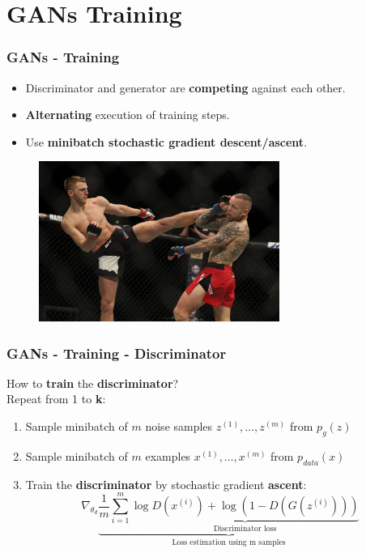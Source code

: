 \documentclass{beamer}
\begin{document}
\section{GANs Training}

\begin{frame}
	\frametitle{GANs - Training}
	\begin{itemize}
		\item Discriminator and generator are \textbf{competing} against each other.
		\item \textbf{Alternating} execution of training steps.
		\item Use \textbf{minibatch stochastic gradient descent/ascent}.
	\end{itemize}
	\begin{figure}
		\centering
		\includegraphics[width=0.7\textwidth]{images/fight.jpg}
	\end{figure}
\end{frame}

\begin{frame}
	\frametitle{GANs - Training - Discriminator}
	How to \textbf{train} the \textbf{discriminator}? \\
	Repeat from 1 to \textbf{k}:
		\begin{enumerate}
			\item Sample minibatch of $m$ noise samples ${z^{(1)},\dots,z^{(m)}}$ from $p_g(z)$
			\item Sample minibatch of $m$ examples ${x^{(1)},\dots,x^{(m)}}$ from $p_{data}(x)$
			\item Train the \textbf{discriminator} by stochastic gradient \textbf{ascent}:
		$$
			\nabla_{\theta_d} \underbrace{\frac{1}{m} \sum_{i=1}^{m} \underbrace{\log D(x^{(i)}) + \log(1 - D(G(z^{(i)})))}_{\text{Discriminator loss}}}_{\text{Loss estimation using m samples}}
		$$
		\end{enumerate}
\end{frame}
\end{document}
